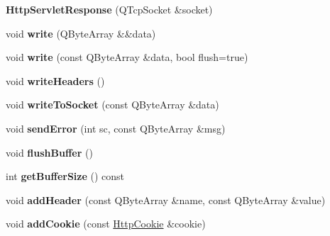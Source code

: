 \begin{DoxyCompactItemize}
\item 
\mbox{\label{class_http_servlet_response_ac275248f0418ac2a300dc3cbb71056eb}} 
{\bfseries Http\+Servlet\+Response} (Q\+Tcp\+Socket \&socket)
\item 
\mbox{\label{class_http_servlet_response_a128d55b31f55938937218632db7aa587}} 
void {\bfseries write} (Q\+Byte\+Array \&\&data)
\item 
\mbox{\label{class_http_servlet_response_ab99b60f65f71d416649f96e9e84c41af}} 
void {\bfseries write} (const Q\+Byte\+Array \&data, bool flush=true)
\item 
\mbox{\label{class_http_servlet_response_a161c99d90e6bd565246bb31784ac71ec}} 
void {\bfseries write\+Headers} ()
\item 
\mbox{\label{class_http_servlet_response_a43db6f1b9c750dd2a66b823291023f3e}} 
void {\bfseries write\+To\+Socket} (const Q\+Byte\+Array \&data)
\item 
\mbox{\label{class_http_servlet_response_a7023895f3b4b730b7a97679bea88466b}} 
void {\bfseries send\+Error} (int sc, const Q\+Byte\+Array \&msg)
\item 
\mbox{\label{class_http_servlet_response_a97cefdfdc34111189c8aef36397c053c}} 
void {\bfseries flush\+Buffer} ()
\item 
\mbox{\label{class_http_servlet_response_a8ffb98c0d0dc7c3808a486f652ba31e7}} 
int {\bfseries get\+Buffer\+Size} () const
\item 
\mbox{\label{class_http_servlet_response_ae9bd0d1b4fa31ffc03e93253a1f41a36}} 
void {\bfseries add\+Header} (const Q\+Byte\+Array \&name, const Q\+Byte\+Array \&value)
\item 
\mbox{\label{class_http_servlet_response_a40fb3e4c9ababe741ddbda87c932409d}} 
void {\bfseries add\+Cookie} (const \mbox{\hyperlink{class_http_cookie}{Http\+Cookie}} \&cookie)

\end{DoxyCompactItemize}
